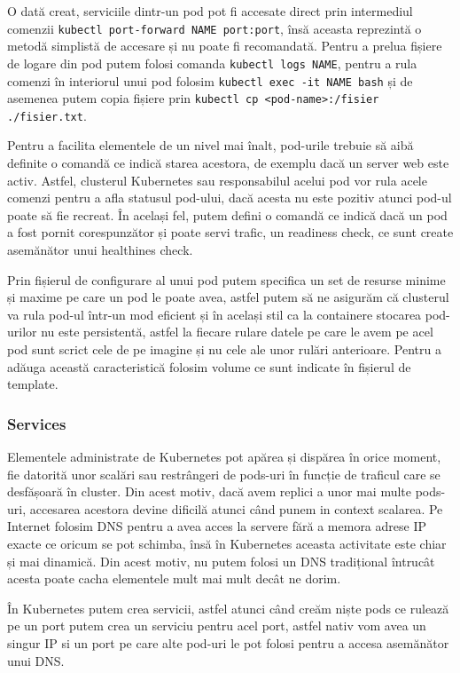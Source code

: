 O dată creat, serviciile dintr-un pod pot fi accesate direct prin intermediul\\
comenzii \verb|kubectl port-forward NAME port:port|, însă aceasta reprezintă o
metodă simplistă de accesare și nu poate fi recomandată. Pentru a prelua fișiere 
de logare din pod putem folosi comanda \verb|kubectl logs NAME|, pentru a rula comenzi în 
interiorul unui pod folosim \verb|kubectl exec -it NAME bash| și de asemenea putem copia fișiere
prin \verb|kubectl cp <pod-name>:/fisier ./fisier.txt|.

Pentru a facilita elementele de un nivel mai înalt, pod-urile trebuie să aibă 
definite o comandă ce indică starea acestora, de exemplu dacă un server web este activ. Astfel,
clusterul Kubernetes sau responsabilul acelui pod vor rula acele comenzi pentru a afla statusul 
pod-ului, dacă acesta nu este pozitiv atunci pod-ul poate să fie recreat. În același fel,
putem defini o comandă ce indică dacă un pod a fost pornit corespunzător și poate servi trafic, 
un readiness check, ce sunt create asemănător unui healthines check.

Prin fișierul de configurare al unui pod putem specifica un set de resurse minime și maxime pe care
un pod le poate avea, astfel putem să ne asigurăm că clusterul va rula pod-ul într-un mod eficient și
în același stil ca la containere stocarea pod-urilor nu este persistentă, astfel la fiecare rulare
datele pe care le avem pe acel pod sunt scrict cele de pe imagine și nu cele ale unor rulări anterioare.
Pentru a adăuga această caracteristică folosim volume ce sunt indicate în fișierul de template.

\subsubsection{Services}

Elementele administrate de Kubernetes pot apărea și dispărea în orice moment, fie datorită
unor scalări sau restrângeri de pods-uri în funcție de traficul care se desfășoară în cluster.
Din acest motiv, dacă avem replici a unor mai multe pods-uri, accesarea acestora devine dificilă 
atunci când punem in context scalarea. Pe Internet folosim DNS pentru a avea acces la 
servere fără a memora adrese IP exacte ce oricum se pot schimba, însă în Kubernetes
aceasta activitate este chiar și mai dinamică. Din acest motiv, nu putem folosi 
un DNS tradițional întrucât acesta poate cacha elementele mult mai mult decât ne dorim.

În Kubernetes putem crea servicii, astfel atunci când creăm niște pods ce rulează pe un port
putem crea un serviciu pentru acel port, astfel nativ vom avea un singur IP si un port
pe care alte pod-uri le pot folosi pentru a accesa asemănător unui DNS.

